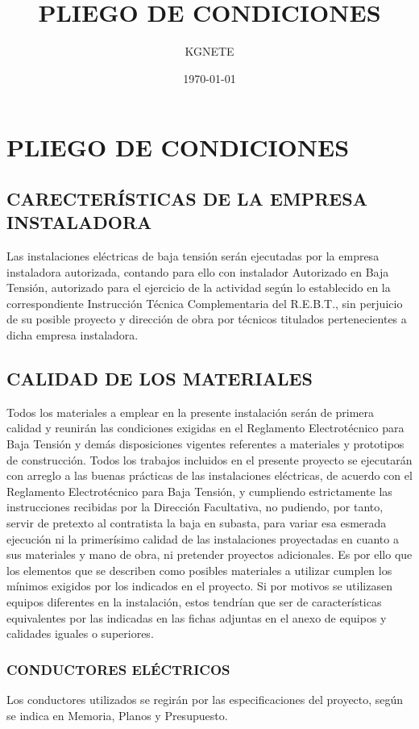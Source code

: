 \documentclass{article}
\title{PLIEGO DE CONDICIONES}
\author{KGNETE}
\date{\today}
\begin{document}
\maketitle
\section{PLIEGO DE CONDICIONES}

\subsection{CARECTERÍSTICAS DE LA EMPRESA INSTALADORA}
Las instalaciones eléctricas de baja tensión serán ejecutadas por la empresa instaladora
autorizada, contando para ello con instalador Autorizado en Baja Tensión, autorizado para el
ejercicio de la actividad según lo establecido en la correspondiente Instrucción Técnica
Complementaria del R.E.B.T., sin perjuicio de su posible proyecto y dirección de obra por
técnicos titulados pertenecientes a dicha empresa instaladora.




\subsection{CALIDAD DE LOS MATERIALES}
Todos los materiales a emplear en la presente instalación serán de primera calidad y reunirán
las condiciones exigidas en el Reglamento Electrotécnico para Baja Tensión y demás
disposiciones vigentes referentes a materiales y prototipos de construcción.
Todos los trabajos incluidos en el presente proyecto se ejecutarán con arreglo a las buenas
prácticas de las instalaciones eléctricas, de acuerdo con el Reglamento Electrotécnico para
Baja Tensión, y cumpliendo estrictamente las instrucciones recibidas por la Dirección
Facultativa, no pudiendo, por tanto, servir de pretexto al contratista la baja en subasta, para
variar esa esmerada ejecución ni la primerísimo calidad de las instalaciones proyectadas en
cuanto a sus materiales y mano de obra, ni pretender proyectos adicionales.
Es por ello que los elementos que se describen como posibles materiales a utilizar cumplen los
mínimos exigidos por los indicados en el proyecto. Si por motivos se utilizasen equipos
diferentes en la instalación, estos tendrían que ser de características equivalentes por las
indicadas en las fichas adjuntas en el anexo de equipos y calidades iguales o superiores.




\subsubsection{CONDUCTORES ELÉCTRICOS}
Los conductores utilizados se regirán por las especificaciones del proyecto, según se indica en
Memoria, Planos y Presupuesto.
\end{document}
